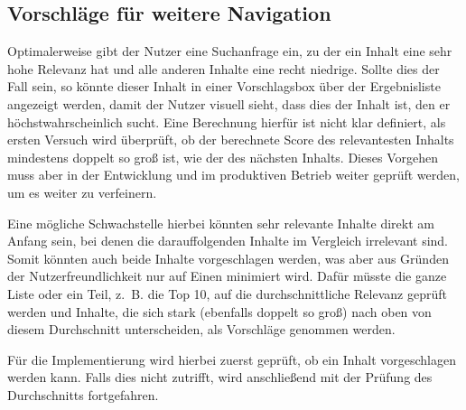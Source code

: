 \subsection{Vorschläge für weitere Navigation}
\label{sub:suggestion}
Optimalerweise gibt der Nutzer eine Suchanfrage ein, zu der ein Inhalt eine sehr hohe Relevanz hat und alle anderen Inhalte eine recht niedrige.
Sollte dies der Fall sein, so könnte dieser Inhalt in einer Vorschlagsbox über der Ergebnisliste angezeigt werden, damit der Nutzer visuell sieht, dass dies der Inhalt ist, den er höchstwahrscheinlich sucht.
Eine Berechnung hierfür ist nicht klar definiert, als ersten Versuch wird überprüft, ob der berechnete Score des relevantesten Inhalts mindestens doppelt so groß ist, wie der des nächsten Inhalts.
Dieses Vorgehen muss aber in der Entwicklung und im produktiven Betrieb weiter geprüft werden, um es weiter zu verfeinern.

Eine mögliche Schwachstelle hierbei könnten sehr relevante Inhalte direkt am Anfang sein, bei denen die darauffolgenden Inhalte im Vergleich irrelevant sind.
Somit könnten auch beide Inhalte vorgeschlagen werden, was aber aus Gründen der Nutzerfreundlichkeit nur auf Einen minimiert wird.
Dafür müsste die ganze Liste oder ein Teil, z. B. die Top 10, auf die durchschnittliche Relevanz geprüft werden und Inhalte, die sich stark (ebenfalls doppelt so groß) nach oben von diesem Durchschnitt unterscheiden, als Vorschläge genommen werden.

Für die Implementierung wird hierbei zuerst geprüft, ob ein Inhalt vorgeschlagen werden kann. Falls dies nicht zutrifft, wird anschließend mit der Prüfung des Durchschnitts fortgefahren.
